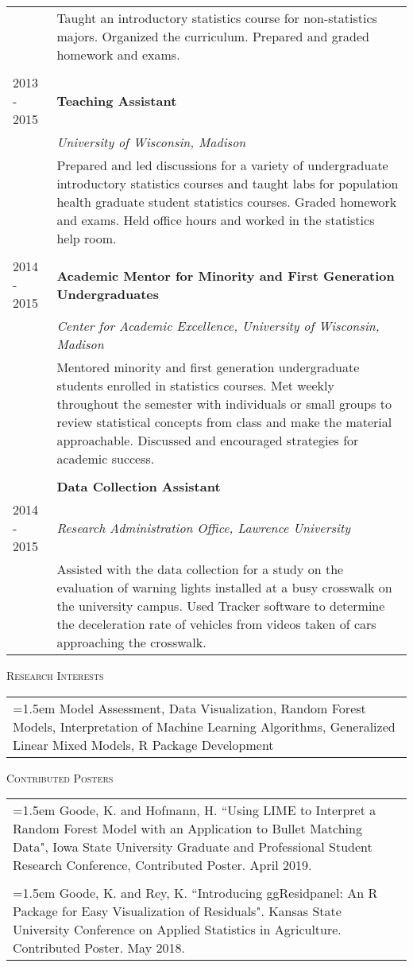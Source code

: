 \documentclass[10pt, oneside]{article}
\begin{document}
\begin{longtable}{p{2.5cm}p{14cm}}
& Taught an introductory statistics course for non-statistics majors. Organized the curriculum. Prepared and graded homework and exams.\\
\\
\hfill{2013 - 2015} & \textbf{Teaching Assistant}\\
& \emph{University of Wisconsin, Madison}\\
& Prepared and led discussions for a variety of undergraduate introductory statistics courses and taught labs for population health graduate student statistics courses. Graded homework and exams. Held office hours and worked in the statistics help room.\\
\\
\hfill{2014 - 2015} & \textbf{Academic Mentor for Minority and First Generation Undergraduates}\\
& \emph{Center for Academic Excellence, University of Wisconsin, Madison}\\
& Mentored minority and first generation undergraduate students enrolled in statistics courses. Met weekly throughout the semester with individuals or small groups to review statistical concepts from class and make the material approachable. Discussed and encouraged strategies for academic success.\\
\\
& \textbf{Data Collection Assistant}\\
\hfill{2014 - 2015} & \emph{Research Administration Office, Lawrence University}\\
& Assisted with the data collection for a study on the evaluation of warning lights installed at a busy crosswalk on the university campus. Used Tracker software to determine the deceleration rate of vehicles from videos taken of cars approaching the crosswalk.
\end{longtable}

\noindent \textsc{Research Interests} \hrulefill
\begin{longtable}{p{16.5cm}}
\hangindent=1.5em Model Assessment, Data Visualization, Random Forest Models, Interpretation of Machine Learning Algorithms, Generalized Linear Mixed Models, R Package Development
\end{longtable}

\noindent \textsc{Contributed Posters} \hrulefill
\begin{longtable}{p{16.5cm}}
\hangindent=1.5em Goode, K. and Hofmann, H. ``Using LIME to Interpret a Random Forest Model with an Application to Bullet Matching Data", Iowa State University Graduate and Professional Student Research Conference, Contributed Poster. April 2019.\\
\\ 
\hangindent=1.5em Goode, K. and Rey, K. ``Introducing ggResidpanel: An R Package for Easy Visualization of Residuals". Kansas State University Conference on Applied Statistics in Agriculture. Contributed Poster. May 2018.
\end{longtable}
\end{document}
